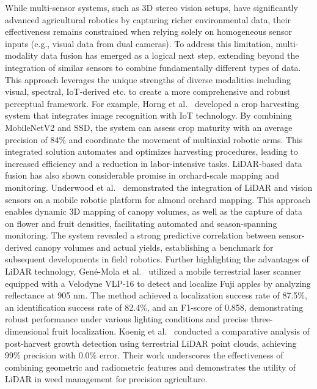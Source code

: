 \documentclass[a4paper,fleqn]{cas-dc}
\begin{document}
While multi-sensor systems, such as 3D stereo vision setups, have significantly advanced agricultural robotics by capturing richer environmental data, their effectiveness remains constrained when relying solely on homogeneous sensor inputs (e.g., visual data from dual cameras). To address this limitation, multi-modality data fusion has emerged as a logical next step, extending beyond the integration of similar sensors to combine fundamentally different types of data. This approach leverages the unique strengths of diverse modalities including visual, spectral, IoT-derived etc. to create a more comprehensive and robust perceptual framework.
For example, Horng et al.~\cite{horng2019smart} developed a crop harvesting system that integrates image recognition with IoT technology. By combining MobileNetV2 and SSD, the system can assess crop maturity with an average precision of 84\% and coordinate the movement of multiaxial robotic arms. This integrated solution automates and optimizes harvesting procedures, leading to increased efficiency and a reduction in labor-intensive tasks.
LiDAR-based data fusion has also shown considerable promise in orchard-scale mapping and monitoring. Underwood et al.~\cite{underwood2016mapping} demonstrated the integration of LiDAR and vision sensors on a mobile robotic platform for almond orchard mapping. This approach enables dynamic 3D mapping of canopy volumes, as well as the capture of data on flower and fruit densities, facilitating automated and season-spanning monitoring. The system revealed a strong predictive correlation between sensor-derived canopy volumes and actual yields, establishing a benchmark for subsequent developments in field robotics.
Further highlighting the advantages of LiDAR technology, Gené-Mola et al.~\cite{gene2019fruit} utilized a mobile terrestrial laser scanner equipped with a Velodyne VLP-16 to detect and localize Fuji apples by analyzing reflectance at 905 nm. The method achieved a localization success rate of 87.5\%, an identification success rate of 82.4\%, and an F1-score of 0.858, demonstrating robust performance under various lighting conditions and precise three-dimensional fruit localization. Koenig et al.~\cite{koenig2015comparative} conducted a comparative analysis of post-harvest growth detection using terrestrial LiDAR point clouds, achieving 99\% precision with 0.0\% error. Their work underscores the effectiveness of combining geometric and radiometric features and demonstrates the utility of LiDAR in weed management for precision agriculture.
\end{document}

